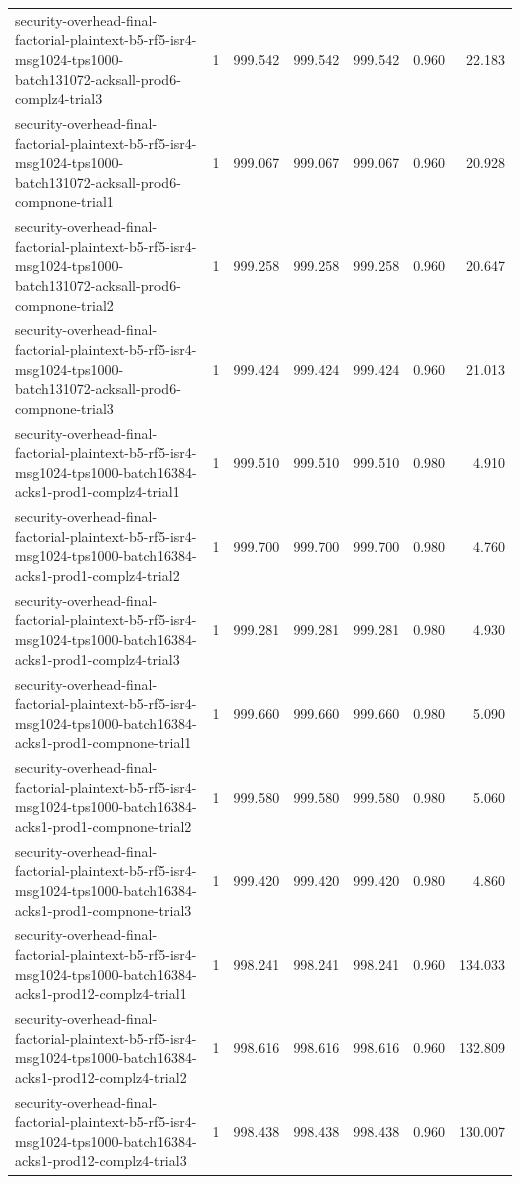 \begin{tabular}{lrrrrrr}
security-overhead-final-factorial-plaintext-b5-rf5-isr4-msg1024-tps1000-batch131072-acksall-prod6-complz4-trial3 & 1 & 999.542 & 999.542 & 999.542 & 0.960 & 22.183 \\
security-overhead-final-factorial-plaintext-b5-rf5-isr4-msg1024-tps1000-batch131072-acksall-prod6-compnone-trial1 & 1 & 999.067 & 999.067 & 999.067 & 0.960 & 20.928 \\
security-overhead-final-factorial-plaintext-b5-rf5-isr4-msg1024-tps1000-batch131072-acksall-prod6-compnone-trial2 & 1 & 999.258 & 999.258 & 999.258 & 0.960 & 20.647 \\
security-overhead-final-factorial-plaintext-b5-rf5-isr4-msg1024-tps1000-batch131072-acksall-prod6-compnone-trial3 & 1 & 999.424 & 999.424 & 999.424 & 0.960 & 21.013 \\
security-overhead-final-factorial-plaintext-b5-rf5-isr4-msg1024-tps1000-batch16384-acks1-prod1-complz4-trial1 & 1 & 999.510 & 999.510 & 999.510 & 0.980 & 4.910 \\
security-overhead-final-factorial-plaintext-b5-rf5-isr4-msg1024-tps1000-batch16384-acks1-prod1-complz4-trial2 & 1 & 999.700 & 999.700 & 999.700 & 0.980 & 4.760 \\
security-overhead-final-factorial-plaintext-b5-rf5-isr4-msg1024-tps1000-batch16384-acks1-prod1-complz4-trial3 & 1 & 999.281 & 999.281 & 999.281 & 0.980 & 4.930 \\
security-overhead-final-factorial-plaintext-b5-rf5-isr4-msg1024-tps1000-batch16384-acks1-prod1-compnone-trial1 & 1 & 999.660 & 999.660 & 999.660 & 0.980 & 5.090 \\
security-overhead-final-factorial-plaintext-b5-rf5-isr4-msg1024-tps1000-batch16384-acks1-prod1-compnone-trial2 & 1 & 999.580 & 999.580 & 999.580 & 0.980 & 5.060 \\
security-overhead-final-factorial-plaintext-b5-rf5-isr4-msg1024-tps1000-batch16384-acks1-prod1-compnone-trial3 & 1 & 999.420 & 999.420 & 999.420 & 0.980 & 4.860 \\
security-overhead-final-factorial-plaintext-b5-rf5-isr4-msg1024-tps1000-batch16384-acks1-prod12-complz4-trial1 & 1 & 998.241 & 998.241 & 998.241 & 0.960 & 134.033 \\
security-overhead-final-factorial-plaintext-b5-rf5-isr4-msg1024-tps1000-batch16384-acks1-prod12-complz4-trial2 & 1 & 998.616 & 998.616 & 998.616 & 0.960 & 132.809 \\
security-overhead-final-factorial-plaintext-b5-rf5-isr4-msg1024-tps1000-batch16384-acks1-prod12-complz4-trial3 & 1 & 998.438 & 998.438 & 998.438 & 0.960 & 130.007 \\

\end{tabular}

